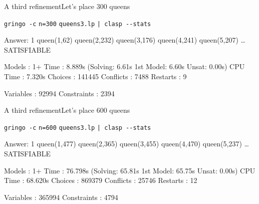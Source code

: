 \begin{frame}[fragile]{A third refinement}{Let's place \alert{$300$} queens}
\begin{block}{\alert<1>{\lstinline{gringo -c} \alert{\lstinline{n=300}} \lstinline{queens3.lp} \lstinline{| clasp --stats}}}
\vspace*{-3mm}
\pause\footnotesize%
\begin{semiverbatim}
Answer: 1
queen(1,62) queen(2,232) queen(3,176) queen(4,241) queen(5,207) \dots{}
SATISFIABLE

Models      : 1+
\alert<2-3>{Time        : 8.889s} (\alert<3>{Solving: 6.61s} 1st Model: 6.60s Unsat: 0.00s)
CPU Time    : 7.320s
Choices     : 141445
\alert<2>{Conflicts   : 7488}
Restarts    : 9

\alert<2>{Variables   : 92994}
\alert<2>{Constraints : 2394}
\end{semiverbatim}
\end{block}
\end{frame}
\begin{frame}[fragile]{A third refinement}{Let's place \alert{$600$} queens}
\begin{block}{\alert<1>{\lstinline{gringo -c} \alert{\lstinline{n=600}} \lstinline{queens3.lp} \lstinline{| clasp --stats}}}
\vspace*{-3mm}
\pause\footnotesize%
\begin{semiverbatim}
Answer: 1
queen(1,477) queen(2,365) queen(3,455) queen(4,470) queen(5,237) \dots{}
SATISFIABLE

Models      : 1+
\alert<2>{Time        : 76.798s} (\alert<2>{Solving: 65.81s} 1st Model: 65.75s Unsat: 0.00s)
CPU Time    : 68.620s
Choices     : 869379
\alert<2>{Conflicts   : 25746}
Restarts    : 12

\alert<2>{Variables   : 365994}
\alert<2>{Constraints : 4794}
\end{semiverbatim}
\end{block}
\end{frame}
